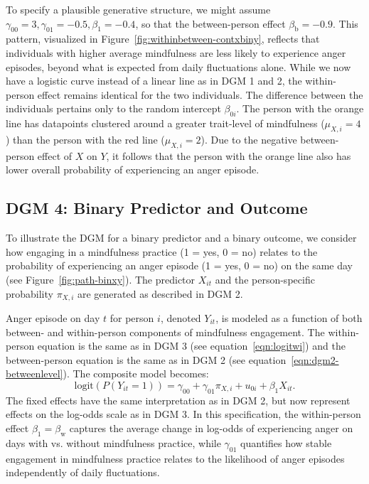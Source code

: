 To specify a plausible generative structure, we might assume \( \gamma_{00} = 3, \gamma_{01} = -0.5, \beta_1 = -0.4 \), so that the between-person effect \( \beta_\text{b} = -0.9 \). This pattern, visualized in Figure~\ref{fig:withinbetween-contxbiny}, reflects that individuals with higher average mindfulness are less likely to experience anger episodes, beyond what is expected from daily fluctuations alone. While we now have a logistic curve instead of a linear line as in DGM 1 and 2, the within-person effect remains identical for the two individuals. The difference between the individuals pertains only to the random intercept $\beta_{0i}$. The person with the orange line has datapoints clustered around a greater trait-level of mindfulness ($\mu_{X,i} = 4$) than the person with the red line ($\mu_{X,i} = 2$). Due to the negative between-person effect of $X$ on $Y$, it follows that the person with the orange line also has lower overall probability of experiencing an anger episode.

% 

\subsection{DGM 4: Binary Predictor and Outcome}

To illustrate the DGM for a binary predictor and a binary outcome, we consider how engaging in a mindfulness practice (1 = yes, 0 = no) relates to the probability of experiencing an anger episode (1 = yes, 0 = no) on the same day (see Figure~\ref{fig:path-binxy}). The predictor \( X_{it} \) and the person-specific probability $\pi_{X,i}$ are generated as described in DGM 2. 

Anger episode on day \( t \) for person \( i \), denoted \( Y_{it} \), is modeled as a function of both between- and within-person components of mindfulness engagement. The within-person equation is the same as in DGM 3 (see equation~\ref{eqn:logitwi}) and the between-person equation is the same as in DGM 2 (see equation~\ref{eqn:dgm2-betweenlevel}). The composite model becomes:
\begin{equation}
    \text{logit}(P(Y_{it} = 1)) = \gamma_{00} + \gamma_{01} \pi_{X,i} + u_{0i} + \beta_1 X_{it}.
\end{equation}
The fixed effects have the same interpretation as in DGM 2, but now represent effects on the log-odds scale as in DGM 3. In this specification, the within-person effect \( \beta_1 = \beta_{\text{w}} \) captures the average change in log-odds of experiencing anger on days with vs. without mindfulness practice, while \( \gamma_{01} \) quantifies how stable engagement in mindfulness practice relates to the likelihood of anger episodes independently of daily fluctuations.

